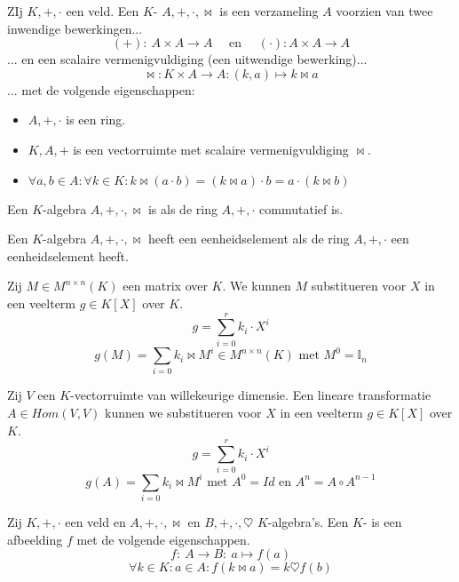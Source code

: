 \documentclass[main.tex]{subfiles}
\begin{document}
\begin{de}
  ZIj $K,+,\cdot$ een veld.
  Een $K$- $A,+,\cdot,\bowtie$ is een verzameling $A$ voorzien van twee inwendige bewerkingen...
  \[ (+):\ A \times A \rightarrow A \quad\text{ en }\quad (\cdot): A \times A \rightarrow A \]
  ... en een scalaire vermenigvuldiging (een uitwendige bewerking)...
  \[ \bowtie: K \times A \rightarrow A: (k,a) \mapsto k \bowtie a \]
  ... met de volgende eigenschappen:
  \begin{itemize}
  \item $A,+,\cdot$ is een ring.
  \item $K,A,+$ is een vectorruimte met scalaire vermenigvuldiging $\bowtie$.
  \item $\forall a,b \in A: \forall k \in K: k \bowtie (a\cdot b) = (k \bowtie a) \cdot b = a \cdot (k \bowtie b)$
  \end{itemize}
\end{de}

\begin{de}
  Een $K$-algebra $A,+,\cdot,\bowtie$ is  als de ring $A,+,\cdot$ commutatief is.
\end{de}

\begin{de}
  Een $K$-algebra $A,+,\cdot,\bowtie$ heeft een eenheidselement als de ring $A,+,\cdot$ een eenheidselement heeft.
\end{de}

\begin{de}
  Zij $M \in M^{n\times n}(K)$ een matrix over $K$.
  We kunnen $M$ substitueren voor $X$ in een veelterm $g\in K[X]$ over $K$.
  \[ g = \sum_{i=0}^{r}k_{i}\cdot X^{i} \]
  \[ g(M) = \sum_{i=0}k_{i}\bowtie M^{i} \in M^{n\times n}(K)\text{ met } M^{0} = \mathbb{I}_{n} \]
\end{de}

\begin{de}
  Zij $V$ een $K$-vectorruimte van willekeurige dimensie.
  Een lineare transformatie $A \in Hom(V,V)$ kunnen we substitueren voor $X$ in een veelterm $g\in K[X]$ over $K$.
  \[ g = \sum_{i=0}^{r}k_{i}\cdot X^{i} \]
  \[ g(A) = \sum_{i=0}k_{i}\bowtie M^{i} \text{ met } A^{0} = Id \text{ en } A^{n} = A\circ A^{n-1}\]
\end{de}

\begin{de}
  Zij $K,+,\cdot$ een veld en $A,+,\cdot,\bowtie$ en $B,+,\cdot,\heartsuit$ $K$-algebra's.
  Een $K$- is een afbeelding $f$ met de volgende eigenschappen.
  \[ f:\ A \rightarrow B:\ a \mapsto f(a) \]
  \[ \forall k\in K: a\in A: f(k\bowtie a) = k \heartsuit f(b) \]
\end{de}
\end{document}
